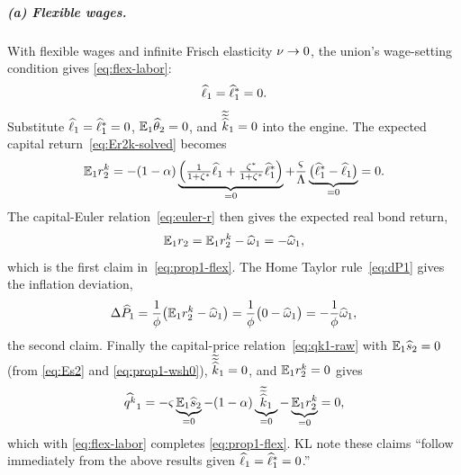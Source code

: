 \subparagraph{(a) Flexible wages.} With flexible wages and infinite Frisch
elasticity $\nu\to0$, the union's wage-setting condition gives
\eqref{eq:flex-labor}:
\[
\widehat{\ell}_1 = \widehat{\ell}^{*}_1 = 0.
\]
Substitute $\widehat{\ell}_1=\widehat{\ell}^{*}_1=0$, $\mathbb{E}_1\widehat{\theta}_2=0$, and
$\widetilde{\widetilde{\widehat{k}}}_1=0$ into the engine. The expected capital
return~\eqref{eq:Er2k-solved} becomes
\[
\mathbb{E}_1r^{k}_2 = -(1-\alpha)\underbrace{\Bigl(\tfrac{1}{1+\zeta^{*}}\widehat{\ell}_1+\tfrac{\zeta^{*}}{1+\zeta^{*}}\widehat{\ell}^{*}_1\Bigr)}_{=0}
+\frac{\varsigma}{\Lambda}\underbrace{\bigl(\widehat{\ell}^{*}_1-\widehat{\ell}_1\bigr)}_{=0} = 0.
\]
The capital-Euler relation~\eqref{eq:euler-r} then gives the expected real bond
return,
\begin{equation}
\mathbb{E}_1r_2 = \mathbb{E}_1r^{k}_2 - \widehat{\omega}_1 = -\widehat{\omega}_1, \label{eq:prop1a-Er2}
\end{equation}
which is the first claim in~\eqref{eq:prop1-flex}. The Home Taylor
rule~\eqref{eq:dP1} gives the inflation deviation,
\begin{equation}
\Delta\widehat{P}_1 = \frac{1}{\phi}\bigl(\mathbb{E}_1r^{k}_2-\widehat{\omega}_1\bigr)
=\frac{1}{\phi}\bigl(0-\widehat{\omega}_1\bigr) = -\frac{1}{\phi}\widehat{\omega}_1, \label{eq:prop1a-dP}
\end{equation}
the second claim. Finally the capital-price relation~\eqref{eq:qk1-raw} with
$\mathbb{E}_1\widehat{s}_2=0$ (from \eqref{eq:Es2} and \eqref{eq:prop1-wsh0}),
$\widetilde{\widetilde{\widehat{k}}}_1=0$, and $\mathbb{E}_1r^{k}_2=0$ gives
\[
\widehat{q^{k}}_1 = -\varsigma\underbrace{\mathbb{E}_1\widehat{s}_2}_{=0}-(1-\alpha)\underbrace{\widetilde{\widetilde{\widehat{k}}}_1}_{=0}-\underbrace{\mathbb{E}_1r^{k}_2}_{=0}=0,
\]
which with \eqref{eq:flex-labor} completes \eqref{eq:prop1-flex}. KL note these
claims ``follow immediately from the above results given
$\widehat{\ell}_1=\widehat{\ell}^{*}_1=0$.''

